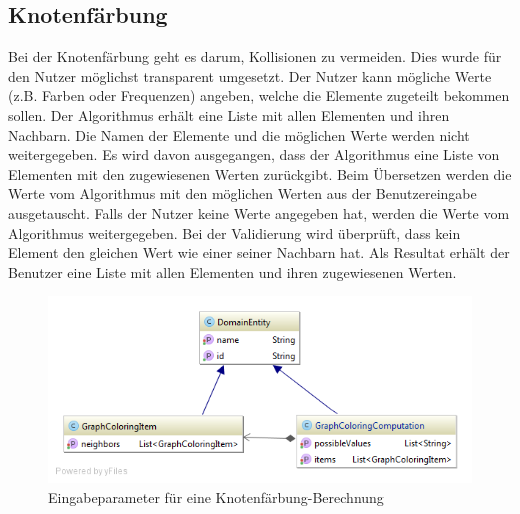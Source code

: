 \FloatBarrier

%
%
%
%

\subsection{Knotenfärbung}
Bei der Knotenfärbung geht es darum, Kollisionen zu vermeiden. Dies wurde für den Nutzer möglichst transparent umgesetzt. Der Nutzer kann mögliche Werte (z.B. Farben oder 
Frequenzen) angeben, welche die Elemente zugeteilt bekommen sollen. Der Algorithmus erhält eine Liste mit allen Elementen und ihren Nachbarn. Die Namen der Elemente und die möglichen 
Werte werden nicht weitergegeben. Es wird davon ausgegangen, dass der Algorithmus eine Liste von Elementen mit den zugewiesenen Werten zurückgibt. Beim Übersetzen werden 
die Werte vom Algorithmus mit den möglichen Werten aus der Benutzereingabe ausgetauscht. Falls der Nutzer keine Werte angegeben hat, werden die Werte vom Algorithmus weitergegeben. 
Bei der Validierung wird überprüft, dass kein Element den gleichen Wert wie einer seiner Nachbarn hat. Als Resultat erhält der Benutzer eine Liste mit allen Elementen und ihren zugewiesenen 
Werten.

\begin{figure}[h]
\centering
\includegraphics[scale=0.5]{images/probleme/graphcoloring.png}
\caption[Eingabeparameter für eine Knotenfärbung-Berechnung]{Eingabeparameter für eine Knotenfärbung-Berechnung \selfmade{}}
\label{fig:graphcoloring_input}
\end{figure}

%
%
%
%


